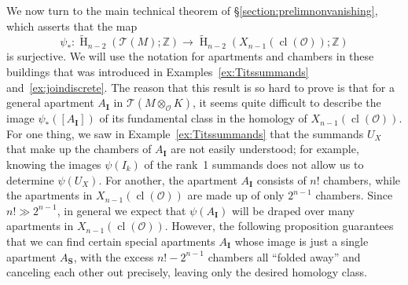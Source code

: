\documentclass[11 pt]{article}
\theoremstyle{plain}
\theoremstyle{definition}
\numberwithin{equation}{section}
\newcommand\Z{\ensuremath{\mathbb{Z}}}
\DeclareMathOperator{\HH}{H}
\renewcommand{\O}{\mathcal{O}}
\DeclareMathOperator{\class}{cl}
\newcommand\Tits{\ensuremath{\mathcal{T}}}
\newcommand\II{\mathbf{I}}
\newcommand\bS{\mathbf{S}}
\newcommand\tensor{\otimes}
\begin{document}
We now turn to the main technical theorem of \S\ref{section:prelimnonvanishing}, which asserts that the map
\[\psi_{\ast}\colon \widetilde{\HH}_{n-2}(\Tits(M);\Z) \rightarrow \widetilde{\HH}_{n-2}(X_{n-1}(\class(\O));\Z)\] 
is surjective.  We will use the notation for apartments and chambers in these buildings that
was introduced in Examples~\ref{ex:Titssummands} and~\ref{ex:joindiscrete}.
The reason that this result is so hard to prove is that for a general  apartment $A_{\II}$
in $\Tits(M\tensor_\O K)$, it seems quite difficult to describe the image $\psi_{\ast}([A_{\II}])$ of its fundamental class in the homology of $X_{n-1}(\class(\O))$.
For one thing, we saw in Example~\ref{ex:Titssummands} that the summands $U_X$ that make up the chambers of $A_{\II}$ are not easily understood; for example, knowing the images $\psi(I_k)$ of the rank~1 summands does not allow us to determine $\psi(U_X)$. For another, the apartment $A_\II$
consists of $n!$ chambers, while the apartments in $X_{n-1}(\class(\O))$ are made up of
only $2^{n-1}$ chambers.  Since $n!\gg 2^{n-1}$, in general we expect that $\psi(A_\II)$
will be draped over many apartments in $X_{n-1}(\class(\O))$.   However, the following
proposition guarantees that we can find certain special apartments $A_\II$ whose
image is just a single apartment $A_{\bS}$, with the excess $n!-2^{n-1}$ chambers
all ``folded away'' and canceling each other out precisely, leaving only the desired homology class.
\end{document}
